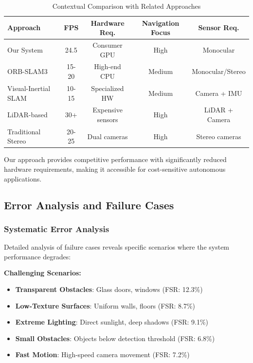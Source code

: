 \documentclass[12pt,oneside]{book}
\begin{document}
\begin{table}[ht]
\centering
\caption{Contextual Comparison with Related Approaches}
\label{tab:sota_comparison}
\begin{tabular}{@{}lcccc@{}}
\toprule
\textbf{Approach} & \textbf{FPS} & \textbf{Hardware Req.} & \textbf{Navigation Focus} & \textbf{Sensor Req.} \\
\midrule
Our System & 24.5 & Consumer GPU & High & Monocular \\
ORB-SLAM3 & 15-20 & High-end CPU & Medium & Monocular/Stereo \\
Visual-Inertial SLAM & 10-15 & Specialized HW & Medium & Camera + IMU \\
LiDAR-based & 30+ & Expensive sensors & High & LiDAR + Camera \\
Traditional Stereo & 20-25 & Dual cameras & High & Stereo cameras \\
\bottomrule
\end{tabular}
\end{table}

Our approach provides competitive performance with significantly reduced hardware requirements, making it accessible for cost-sensitive autonomous applications.

\subsection{Error Analysis and Failure Cases}

\subsubsection{Systematic Error Analysis}

Detailed analysis of failure cases reveals specific scenarios where the system performance degrades:

\textbf{Challenging Scenarios:}
\begin{itemize}
\item \textbf{Transparent Obstacles}: Glass doors, windows (FSR: 12.3\%)
\item \textbf{Low-Texture Surfaces}: Uniform walls, floors (FSR: 8.7\%)
\item \textbf{Extreme Lighting}: Direct sunlight, deep shadows (FSR: 9.1\%)
\item \textbf{Small Obstacles}: Objects below detection threshold (FSR: 6.8\%)
\item \textbf{Fast Motion}: High-speed camera movement (FSR: 7.2\%)
\end{itemize}
\end{document}
